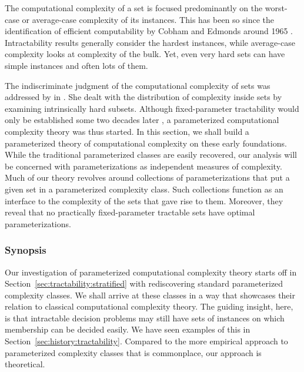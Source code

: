 \label{sec:tractability}%

The computational complexity of a set is focused predominantly on the worst-case or average-case complexity of its instances.
This has been so since the identification of efficient computability by Cobham and Edmonds around 1965 \parencite[see][]{goldreich2008computational}.
Intractability results \parencite{cook1971complexity,garey1979computers} generally consider the hardest instances, while average-case complexity looks at complexity of the bulk.
Yet, even very hard sets can have simple instances and often lots of them.

The indiscriminate judgment of the computational complexity of sets was addressed by \textcite{lynch1975reducibility} in \citeyear{lynch1975reducibility}.
She dealt with the distribution of complexity inside sets by examining intrinsically hard subsets.
Although fixed-parameter tractability would only be established some two decades later \parencite{downey1992fixed}, a parameterized computational complexity theory was thus started.
In this section, we shall build a parameterized theory of computational complexity on these early foundations.
While the traditional parameterized classes are easily recovered, our analysis will be concerned with parameterizations as independent measures of complexity.
Much of our theory revolves around collections of parameterizations that put a given set in a parameterized complexity class.
Such collections function as an interface to the complexity of the sets that gave rise to them.
Moreover, they reveal that no practically fixed-parameter tractable sets have optimal parameterizations.

\subsubsection{Synopsis}
Our investigation of parameterized computational complexity theory starts off in Section~\ref{sec:tractability:stratified} with rediscovering standard parameterized complexity classes.
We shall arrive at these classes in a way that showcases their relation to classical computational complexity theory.
The guiding insight, here, is that intractable decision problems may still have sets of instances on which membership can be decided easily.
We have seen examples of this in Section~\ref{sec:history:tractability}.
Compared to the more empirical approach to parameterized complexity classes that is commonplace, our approach is theoretical.


